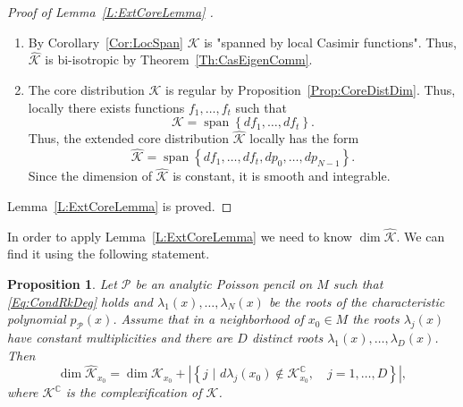 \documentclass[12pt]{article}
\newtheorem{proposition}[lemma]{Proposition}
\theoremstyle{definition}
\begin{document}
\begin{proof}[Proof of Lemma~\ref{L:ExtCoreLemma} ]

\begin{enumerate}

\item By Corollary~\ref{Cor:LocSpan} $\mathcal{K}$ is "spanned by local Casimir functions". Thus, $\hat{\mathcal{K}}$ is bi-isotropic by Theorem~\ref{Th:CasEigenComm}.

\item The core distribution $\mathcal{K}$ is regular by Proposition~\ref{Prop:CoreDistDim}. Thus, locally there exists functions $f_1, \dots, f_t$ such that \[\mathcal{K} =  \operatorname{span} \left\{ df_1,\dots, df_t \right\}.\] Thus, the extended core distribution $\hat{\mathcal{K}}$ locally has the form \begin{equation} \label{Eq:ExCoreSpan} \hat{\mathcal{K}} =  \operatorname{span} \left\{  df_1, \dots, df_t, dp_0, \dots, dp_{N-1} \right\}. \end{equation} Since the dimension of $\hat{\mathcal{K}}$ is constant, it is smooth and integrable. 
\end{enumerate}


Lemma~\ref{L:ExtCoreLemma} is proved.  \end{proof}


In order to apply Lemma~\ref{L:ExtCoreLemma} we need to know $\operatorname{dim} \hat{\mathcal{K}}$. We can find it using the following statement.


\begin{proposition} \label{Prop:DimExtCore} Let $\mathcal{P}$ be an analytic Poisson pencil on $M$ such that \eqref{Eq:CondRkDeg} holds and $\lambda_1(x), \dots, \lambda_N(x)$ be the roots of the characteristic polynomial $p_{\mathcal{P}}(x)$. Assume that in a neighborhood of $x_0 \in M$ the roots $\lambda_j(x)$ have constant multiplicities and there are $D$ distinct roots $\lambda_1(x), \dots, \lambda_D(x)$. Then \begin{equation} \label{Eq:DimExtCore} \dim \hat{\mathcal{K}}_{x_0} = \dim \mathcal{K}_{x_0} + \left| \left\{ j  \, \, \bigr| \, \, d \lambda_j(x_0) \not \in \mathcal{K}_{x_0}^{\mathbb{C}}, \quad j=1,\dots, D \right\} \right|, \end{equation} where $\mathcal{K}^{\mathbb{C}}$ is the complexification of $\mathcal{K}$. \end{proposition}
\end{document}
